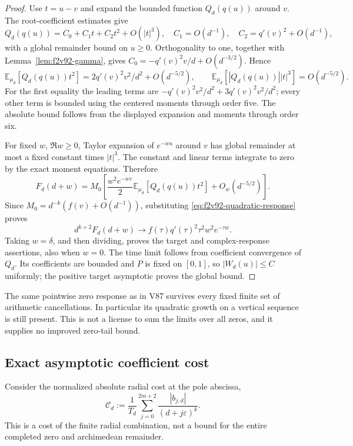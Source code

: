 \documentclass[11pt]{article}
\theoremstyle{definition}
\theoremstyle{remark}
\begin{document}
\begin{proof}
Use \(t=u-v\) and expand the bounded function \(Q_d(q(u))\)
around \(v\).  The root-coefficient estimates give
\[
 Q_d(q(u))=C_0+C_1t+C_2t^2+O(|t|^3),\quad
 C_1=O(d^{-1}),\quad C_2=q'(v)^2+O(d^{-1}),
\]
with a global remainder bound on \(u\ge0\).  Orthogonality to
one, together with Lemma~\ref{lem:f2v92-gamma}, gives
\(C_0=-q'(v)^2v/d+O(d^{-3/2})\).  Hence
\begin{equation}
 \mathbb E_{\mu_d}[Q_d(q(u))t^2]
 =2q'(v)^2v^2/d^2+O(d^{-5/2}),\qquad
 \mathbb E_{\mu_d}[|Q_d(q(u))||t|^3]=O(d^{-5/2}).
 \label{eq:f2v92-quadratic-response}
\end{equation}
For the first equality the leading terms are
\(-q'(v)^2v^2/d^2+3q'(v)^2v^2/d^2\); every other term is
bounded using the centered moments through order five.  The absolute
bound follows from the displayed expansion and moments through order six.

For fixed \(w\), \(\Re w\ge0\), Taylor expansion of
\(e^{-wu}\) around \(v\) has global remainder at most a fixed
constant times \(|t|^3\).  The constant and linear terms integrate
to zero by the exact moment equations.  Therefore
\[
 F_d(d+w)=M_0\left[
 \frac{w^2e^{-wv}}2\mathbb E_{\mu_d}[Q_d(q(u))t^2]
              +O_w(d^{-5/2})\right].
\]
Since \(M_0=d^{-k}(f(v)+O(d^{-1}))\), substituting
\eqref{eq:f2v92-quadratic-response} proves
\[
 d^{k+2}F_d(d+w)\longrightarrow
 f(\tau)q'(\tau)^2\tau^2 w^2 e^{-\tau w}.
\]
Taking \(w=\delta\), and then dividing, proves the target and
complex-response assertions, also when \(w=0\).  The time limit
follows from coefficient convergence of \(Q_d\).  Its coefficients
are bounded and \(P\) is fixed on \([0,1]\), so \(|W_d(u)|\le C\)
uniformly; the positive target asymptotic proves the global bound.
\end{proof}

The same pointwise zero response as in V87 survives every fixed finite
set of arithmetic cancellations.  In particular its quadratic growth
on a vertical sequence is still present.  This is not a license to sum
the limits over all zeros, and it supplies no improved zero-tail bound.

\subsection{Exact asymptotic coefficient cost}

Consider the normalized absolute radial cost at the pole abscissa,
\begin{equation}
 \mathcal C_d:=\frac1{T_d}
       \sum_{j=0}^{2m+2}\frac{|b_{j,d}|}{(d+j\varepsilon)^k}.
 \label{eq:f2v92-cost}
\end{equation}
This is a cost of the finite radial combination, not a bound for the
entire completed zero and archimedean remainder.
\end{document}
